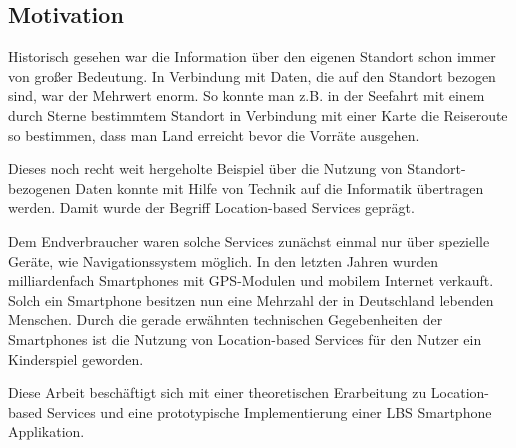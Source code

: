 \subsection{Motivation}

Historisch gesehen war die Information über den eigenen Standort schon immer von großer Bedeutung. In Verbindung mit Daten, die auf den Standort bezogen sind, war der Mehrwert enorm. So konnte man z.B. in der Seefahrt mit einem durch Sterne bestimmtem Standort in Verbindung mit einer Karte die Reiseroute so bestimmen, dass man Land erreicht bevor die Vorräte ausgehen.

Dieses noch recht weit hergeholte Beispiel über die Nutzung von Standort-bezogenen Daten konnte mit Hilfe von Technik auf die Informatik übertragen werden. Damit wurde der Begriff Location-based Services geprägt. 

Dem Endverbraucher waren solche Services zunächst einmal nur über spezielle Geräte, wie Navigationssystem möglich. In den letzten Jahren wurden milliardenfach Smartphones mit GPS-Modulen und mobilem Internet verkauft. Solch ein Smartphone besitzen nun eine Mehrzahl der in Deutschland lebenden Menschen. Durch die gerade erwähnten technischen Gegebenheiten der Smartphones ist die Nutzung von Location-based Services für den Nutzer ein Kinderspiel geworden. 

Diese Arbeit beschäftigt sich mit einer theoretischen Erarbeitung zu Location-based Services und eine prototypische Implementierung einer LBS Smartphone Applikation.

\newpage
